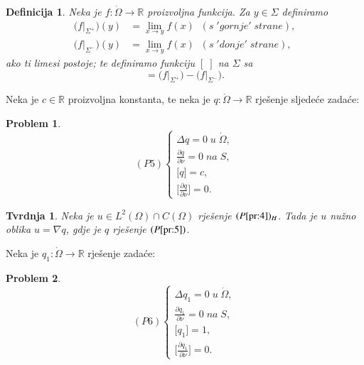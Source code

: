 \documentclass[a4paper,oneside,12pt]{memoir} %
\newtheorem{definicija}[teorem]{Definicija}
\newtheorem{problem}{Problem}
\newtheorem{tvrdnja}[teorem]{Tvrdnja}
\begin{document}
\begin{definicija}
Neka je $f : \dot{\Omega} \rightarrow \mathbb{R}$ proizvoljna funkcija. Za $y \in \Sigma$ definiramo
\begin{align*}
\Big( f\big|_{\Sigma^+} \Big) (y) &= \lim_{x \rightarrow y} f(x) \;\; (s \; 'gornje' \; strane), \\
\Big( f\big|_{\Sigma^-} \Big) (y) &= \lim_{x \rightarrow y} f(x) \;\; (s \; 'donje' \; strane),
\end{align*}
ako ti limesi postoje; \newline
te definiramo funkciju $[\;]$ na $\Sigma$ sa
\begin{equation*}
[f] = \Big( f\big|_{\Sigma^+} \Big) - \Big( f\big|_{\Sigma^-} \Big).
\end{equation*}
\end{definicija}

Neka je $c \in \mathbb{R}$ proizvoljna konstanta, te neka je $q : \dot{\Omega} \rightarrow \mathbb{R}$ rješenje sljedeće zadaće:
\begin{problem} \label{pr:5}
\[
	(P5) \left\{
		\begin{array}{ll}
			\Delta q = 0 \; u \; \dot{\Omega}, \\
			\frac{\partial q}{\partial \nu} = 0 \; na \; S, \\
			\big[q\big] = c, \\
			\Big[\frac{\partial q}{\partial \nu}\Big] = 0.
		\end{array}
		\right.
\]
\end{problem}

\begin{tvrdnja}
Neka je $u \in L^2(\Omega) \cap C(\Omega)$ rješenje $(P\ref{pr:4})_H$. Tada je $u$ nužno oblika $u = \nabla q$, gdje je $q$ rješenje $(P\ref{pr:5})$.
\end{tvrdnja}

Neka je $q_1 : \dot{\Omega} \rightarrow \mathbb{R}$ rješenje zadaće:
\begin{problem} \label{pr:6}
\[
	(P6) \left\{
		\begin{array}{ll}
			\Delta q_1 = 0 \; u \; \dot{\Omega}, \\
			\frac{\partial q_1}{\partial \nu} = 0 \; na \; S, \\
			\big[q_1\big] = 1, \\
			\Big[\frac{\partial q_1}{\partial \nu}\Big] = 0.
		\end{array}
		\right.
\]
\end{problem}
\end{document}

